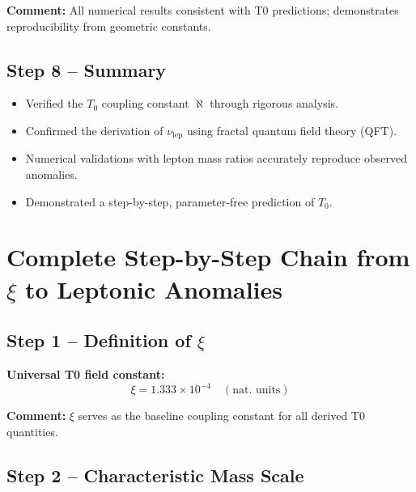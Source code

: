 \documentclass[12pt,a4paper]{article}
\begin{document}
\textbf{Comment:} All numerical results consistent with T0 predictions; demonstrates reproducibility from geometric constants.

\subsection{Step 8 – Summary}

\begin{itemize}
	\item Verified the $T_0$ coupling constant $\aleph$ through rigorous analysis.
	\item Confirmed the derivation of $\nu_{\text{lep}}$ using fractal quantum field theory (QFT).
	\item Numerical validations with lepton mass ratios accurately reproduce observed anomalies.
	\item Demonstrated a step-by-step, parameter-free prediction of $T_0$.
\end{itemize}
\section{Complete Step-by-Step Chain from \(\xi\) to Leptonic Anomalies}

\subsection{Step 1 – Definition of $\xi$}

\textbf{Universal T0 field constant:}
\begin{equation}
	\xi = 1.333 \times 10^{-4} \quad (\text{nat. units})
\end{equation}

\textbf{Comment:} $\xi$ serves as the baseline coupling constant for all derived T0 quantities.

\subsection{Step 2 – Characteristic Mass Scale}
\end{document}
